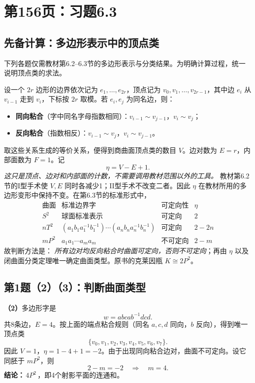 \documentclass[UTF8,11pt,a4paper]{ctexart}
\begin{document}
\clearpage
\section{第156页：习题6.3}

\subsection*{先备计算：多边形表示中的顶点类}
下列各题仅需教材第6.2--6.3节的多边形表示与分类结果。为明确计算过程，统一说明顶点类的求法。

设一个 \(2r\) 边形的边界依次记为 \(e_1,\ldots,e_{2r}\)，顶点记为
\(v_0,v_1,\ldots,v_{2r-1}\)，其中边 \(e_i\) 从 \(v_{i-1}\) 走到 \(v_i\)，下标按 \(2r\) 取模。若 \(e_i,e_j\) 为同名边，则：
\begin{itemize}[topsep=3pt,itemsep=1pt,leftmargin=3.1em]
\item \textbf{同向粘合}（字中同名字母指数相同）：\(v_{i-1}\sim v_{j-1}\)，\(v_i\sim v_j\)；
\item \textbf{反向粘合}（指数相反）：\(v_{i-1}\sim v_j\)，\(v_i\sim v_{j-1}\)。
\end{itemize}
取这些关系生成的等价关系，便得到商曲面顶点类的数目 \(V\)。边对数为 \(E=r\)，内部面数为 \(F=1\)。记
\[
 \eta=V-E+1.
\]
\emph{这只是顶点、边对和内部面的计数，不需要调用教材范围以外的工具。}
教材第6.2节的I型手术使 \(V,E\) 同时各减少1；II型手术不改变二者。因此 \(\eta\) 在教材所用的多边形变形中保持不变。在第6.3节的标准形式中，
\[
 \begin{array}{c|c|c|c}
 \text{曲面} & \text{标准边界字}&\text{可定向性}&\eta\\\hline
 S^2 &\text{球面标准表示}&\text{可定向}&2\\
 nT^2 &(a_1b_1a_1^{-1}b_1^{-1})\cdots(a_nb_na_n^{-1}b_n^{-1})&\text{可定向}&2-2n\\
 mP^2&a_1a_1\cdots a_ma_m&\text{不可定向}&2-m
 \end{array}
\]
故判断方法是：
\emph{所有边对均反向粘合时曲面可定向，否则不可定向}；再由 \(\eta\) 以及闭曲面分类定理唯一确定曲面类型。原书的克莱因瓶 \(K\cong2P^2\)。

\subsection*{第1题（2）（3）：判断曲面类型}

\textbf{（2）}\;多边形字是
\[
 w=abcab^{-1}dcd.
\]
共8条边，\(E=4\)。按上面的端点粘合规则（同名 \(a,c,d\) 同向，\(b\) 反向），得到唯一顶点类
\[
 \{v_0,v_1,v_2,v_3,v_4,v_5,v_6,v_7\}.
\]
因此 \(V=1\)，\(\eta=1-4+1=-2\)。由于出现同向粘合边对，曲面不可定向。设它同胚于 \(mP^2\)，则
\[
 2-m=-2\quad\Longrightarrow\quad m=4.
\]
\textbf{结论：}\(\boxed{\,4P^2\,}\)，即4个射影平面的连通和。
\end{document}
